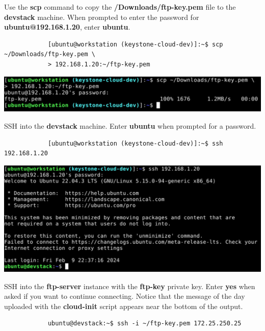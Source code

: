 \documentclass[letterpaper, 12pt]{article}
\begin{document}
\begin{enumerate}
    \begin{labstep}
        Use the \textbf{scp} command to copy the \textbf{\texttildemid/Downloads/ftp-key.pem} file to the \textbf{devstack} machine.
        When prompted to enter the password for \textbf{ubuntu@192.168.1.20}, enter
        \textbf{ubuntu}.
        \begin{lstlisting}
            [ubuntu@workstation (keystone-cloud-dev)]:~$ scp ~/Downloads/ftp-key.pem \
            > 192.168.1.20:~/ftp-key.pem
        \end{lstlisting}

        \begin{center}
            \includegraphics[width=\linewidth]{images/part2/step5.png}
        \end{center}
    \end{labstep}

    \begin{labstep}
        SSH into the \textbf{devstack} machine.
        Enter \textbf{ubuntu} when prompted for a password.
        \begin{lstlisting}
            [ubuntu@workstation (keystone-cloud-dev)]:~$ ssh 192.168.1.20
        \end{lstlisting}

        \begin{center}
            \includegraphics[width=\linewidth]{images/part2/step6.png}
        \end{center}
    \end{labstep}

    \begin{labstep}
        SSH into the \textbf{ftp-server} instance with the \textbf{ftp-key} private key.
        Enter \textbf{yes} when asked if you want to continue connecting.
        Notice that the message of the day uploaded with the \textbf{cloud-init} script appears near the bottom of the output.
        \begin{lstlisting}
            ubuntu@devstack:~$ ssh -i ~/ftp-key.pem 172.25.250.25
        \end{lstlisting}


\end{labstep}
\end{enumerate}
\end{document}
